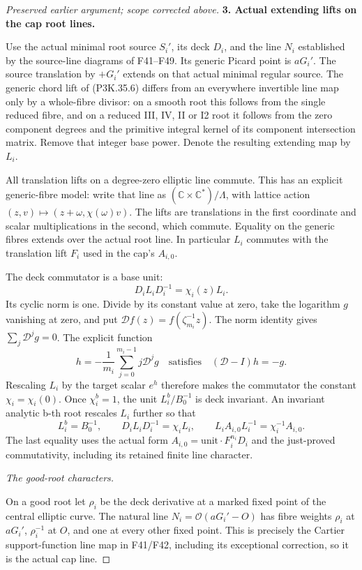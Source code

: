 \begin{proof}[Preserved earlier argument; scope corrected above]
\par\medskip\noindent\textbf{3. Actual extending lifts on the cap root lines.}\enspace

Use the actual minimal root source \(S_i'\), its deck \(D_i\), and
the line \(N_i\) established by the source-line diagrams of F41--F49.
Its generic Picard point is \(aG_i'\). The source translation by
\(+G_i'\) extends on that actual minimal regular source. The generic
chord lift of (P3K.35.6) differs from an everywhere invertible line map
only by a whole-fibre divisor: on a smooth root this follows from
the single reduced fibre, and on a reduced III, IV, II or I2 root
it follows from the zero component degrees and the primitive integral
kernel of its component intersection matrix. Remove that integer
base power. Denote the resulting extending map by \(L_i\).

All translation lifts on a degree-zero elliptic line commute. This
has an explicit generic-fibre model: write that line as
\((\mathbb C\times\mathbb C^*)/\Lambda\), with lattice action
\((z,v)\mapsto(z+\omega,\chi(\omega)v)\). The lifts are translations
in the first coordinate and scalar multiplications in the second,
which commute. Equality on the generic fibres extends over the actual
root line. In particular \(L_i\) commutes with the translation lift
\(F_i\) used in the cap's \(A_{i,0}\).

The deck commutator is a base unit:
\[
                      D_iL_iD_i^{-1}=\chi_i(z)L_i.
\]
Its cyclic norm is one. Divide by its constant value at zero, take
the logarithm \(g\) vanishing at zero, and put
\(\mathcal D f(z)=f(\zeta_{m_i}^{-1}z)\). The norm identity
gives \(\sum_j\mathcal D^jg=0\). The explicit function
\[
 h=-\frac1{m_i}\sum_{j=0}^{m_i-1}j\mathcal D^jg
 \quad\text{satisfies}\quad (\mathcal D-I)h=-g.
\]
Rescaling \(L_i\) by the target scalar \(e^h\) therefore makes
the commutator the constant
\(\chi_i=\chi_i(0)\). Once \(\chi_i^b=1\), the unit
\(L_i^b/B_0^{-1}\) is deck invariant. An invariant analytic b-th
root rescales \(L_i\) further so that
\[
 L_i^b=B_0^{-1},\qquad
 D_iL_iD_i^{-1}=\chi_i L_i,
 \qquad L_iA_{i,0}L_i^{-1}=\chi_i^{-1}A_{i,0}.          \tag{P3K.35.9}
\]
The last equality uses the actual form \(A_{i,0}=\text{unit}\cdot
F_i^{n_i}D_i\) and the just-proved commutativity, including its
retained finite line character.

\par\smallskip\noindent\textit{The good-root characters.}\enspace

On a good root let \(\rho_i\) be the deck derivative at a marked
fixed point of the central elliptic curve. The natural line
\(N_i=\mathcal O(aG_i'-O)\) has fibre weights \(\rho_i\) at
\(aG_i'\), \(\rho_i^{-1}\) at \(O\), and one at every other
fixed point. This is precisely the Cartier support-function line
map in F41/F42, including its exceptional correction, so it is
the actual cap line.


\end{proof}
